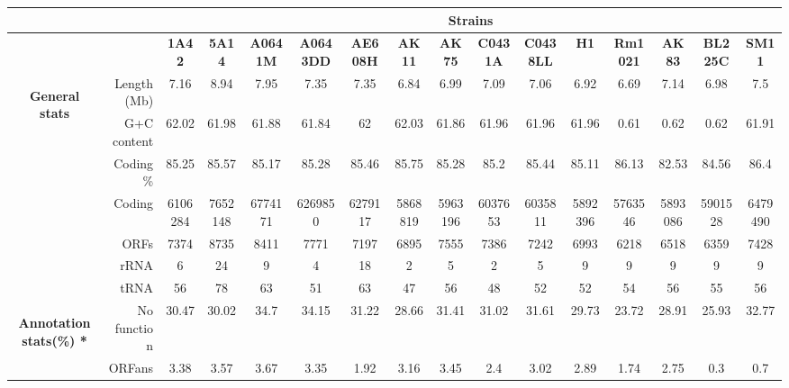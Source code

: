 \begin{table}
  \tabcolsep 4pt
  \tiny
  \centering
    \begin{tabular}{rrcccccccccccccc@{}}
    \toprule
          &       & \multicolumn{14}{c}{\textbf{Strains}} \\
    \midrule
          &       & \textbf{1A42} & \textbf{5A14} & \textbf{A0641M} & \textbf{A0643DD} & \textbf{AE608H} & \textbf{AK11} & \textbf{AK75} & \textbf{C0431A} & \textbf{C0438LL} & \textbf{H1} & \textbf{Rm1021} & \textbf{AK83} & \textbf{BL225C} & \textbf{SM11} \\
    \multicolumn{1}{c}{\multirow{7}[1]{*}{\begin{sideways}\textbf{General stats}\end{sideways}}} & Length (Mb) & 7.16  & 8.94  & 7.95  & 7.35  & 7.35  & 6.84  & 6.99  & 7.09  & 7.06  & 6.92  & 6.69  & 7.14  & 6.98  & 7.5 \\
    \multicolumn{1}{c}{} & G+C content & 62.02 & 61.98 & 61.88 & 61.84 & 62    & 62.03 & 61.86 & 61.96 & 61.96 & 61.96 & 0.61  & 0.62  & 0.62  & 61.91 \\
    \multicolumn{1}{c}{} & Coding \% & 85.25 & 85.57 & 85.17 & 85.28 & 85.46 & 85.75 & 85.28 & 85.2  & 85.44 & 85.11 & 86.13 & 82.53 & 84.56 & 86.4 \\
    \multicolumn{1}{c}{} & Coding & 6106284 & 7652148 & 6774171 & 6269850 & 6279117 & 5868819 & 5963196 & 6037653 & 6035811 & 5892396 & 5763546 & 5893086 & 5901528 & 6479490 \\
    \multicolumn{1}{c}{} & ORFs  & 7374  & 8735  & 8411  & 7771  & 7197  & 6895  & 7555  & 7386  & 7242  & 6993  & 6218  & 6518  & 6359  & 7428 \\
    \multicolumn{1}{c}{} & rRNA  & 6     & 24    & 9     & 4     & 18    & 2     & 5     & 2     & 5     & 9     & 9     & 9     & 9     & 9 \\
    \multicolumn{1}{c}{} & tRNA  & 56    & 78    & 63    & 51    & 63    & 47    & 56    & 48    & 52    & 52    & 54    & 56    & 55    & 56 \\
    \multicolumn{1}{c}{\multirow{7}[0]{*}{\begin{sideways}\textbf{Annotation stats(\%) *}\end{sideways}}} & No function & 30.47 & 30.02 & 34.7  & 34.15 & 31.22 & 28.66 & 31.41 & 31.02 & 31.61 & 29.73 & 23.72 & 28.91 & 25.93 & 32.77 \\
    \multicolumn{1}{c}{} & ORFans & 3.38  & 3.57  & 3.67  & 3.35  & 1.92  & 3.16  & 3.45  & 2.4   & 3.02  & 2.89  & 1.74  & 2.75  & 0.3   & 0.7 \\

\end{tabular}
\end{table}
